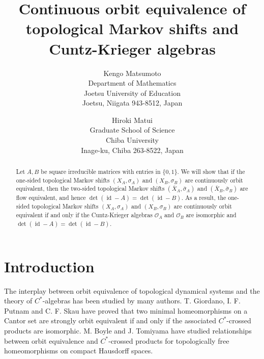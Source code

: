\documentclass[11pt]{article}
\title{Continuous orbit equivalence of topological Markov shifts 
and Cuntz-Krieger algebras}
\author{Kengo Matsumoto \\
Department of Mathematics \\
Joetsu University of Education \\
Joetsu, Niigata 943-8512, Japan
\and
Hiroki Matui \\
Graduate School of Science \\
Chiba University \\
Inage-ku, Chiba 263-8522, Japan}
\date{}
\theoremstyle{definition}
\numberwithin{equation}{section}
\newcommand{\id}{\operatorname{id}}
\begin{document}
\maketitle

\begin{abstract}
Let $A,B$ be square irreducible matrices with entries in $\{0,1\}$. 
We will show that if the one-sided topological Markov shifts 
$(X_A,\sigma_A)$ and $(X_B,\sigma_B)$ are continuously orbit equivalent, 
then the two-sided topological Markov shifts 
$(\bar X_A,\bar\sigma_A)$ and $(\bar X_B,\bar\sigma_B)$ are 
flow equivalent, and hence $\det(\id-A)=\det(\id-B)$. 
As a result, the one-sided topological Markov shifts 
$(X_A,\sigma_A)$ and $(X_B,\sigma_B)$ are continuously orbit equivalent 
if and only if the Cuntz-Krieger algebras 
$\mathcal{O}_A$ and $\mathcal{O}_B$ are isomorphic and 
$\det(\id-A)=\det(\id-B)$. 
\end{abstract}




\section{Introduction}




The interplay between orbit equivalence of topological dynamical systems 
and the theory of $C^*$-algebras has been studied by many authors. 
T. Giordano, I. F. Putnam and C. F. Skau \cite{GPS95crelle} have proved that 
two minimal homeomorphisms on a Cantor set are strongly orbit equivalent 
if and only if the associated $C^*$-crossed products are isomorphic. 
M. Boyle and J. Tomiyama \cite{T96Pacific,BT98JMSJ} have studied 
relationships between orbit equivalence and $C^*$-crossed products 
for topologically free homeomorphisms on compact Hausdorff spaces. 
\end{document}
